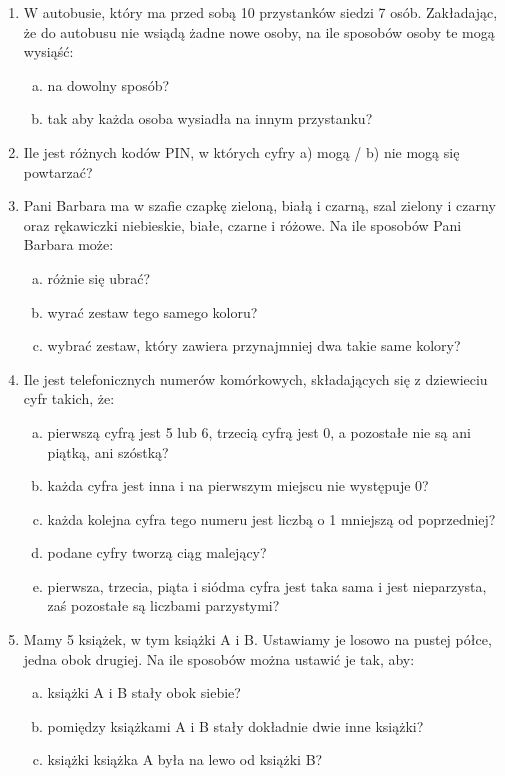 \documentclass[12pt,a4paper]{article}
\begin{document}
\begin{enumerate}[1.]
\begin{enumerate}[a)]
	\end{enumerate}
\newpage
	\item W autobusie, który ma przed sobą 10 przystanków siedzi 7 osób. Zakładając, że do autobusu nie wsiądą żadne nowe osoby, na ile sposobów osoby te mogą wysiąść:
	\begin{enumerate}[a)]
		\item na dowolny sposób?
		\item tak aby każda osoba wysiadła na innym przystanku?
	\end{enumerate}
	\item Ile jest różnych kodów PIN, w których cyfry a) mogą / b) nie mogą się powtarzać?
	\item Pani Barbara ma w szafie czapkę zieloną, białą i czarną, szal zielony i czarny oraz rękawiczki niebieskie, białe, czarne i różowe. Na ile sposobów Pani Barbara może:
	\begin{enumerate}[a)]
		\item różnie się ubrać?
		\item wyrać zestaw tego samego koloru?
		\item wybrać zestaw, który zawiera przynajmniej dwa takie same kolory?
	\end{enumerate}
	\item Ile jest telefonicznych numerów komórkowych, składających się z dziewieciu cyfr takich, że:
	\begin{enumerate}[a)]
		\item pierwszą cyfrą jest 5 lub 6, trzecią cyfrą jest 0, a pozostałe nie są ani piątką, ani szóstką?
		\item każda cyfra jest inna i na pierwszym miejscu nie występuje 0?
		\item każda kolejna cyfra tego numeru jest liczbą o 1 mniejszą od poprzedniej?
		\item podane cyfry tworzą ciąg malejący?
		\item pierwsza, trzecia, piąta i siódma cyfra jest taka sama i jest nieparzysta, zaś pozostałe są liczbami parzystymi?
	\end{enumerate}
	\item Mamy 5 książek, w tym książki A i B. Ustawiamy je losowo na pustej półce, jedna obok drugiej. Na ile sposobów można ustawić je tak, aby:
	\begin{enumerate}[a)]
		\item książki A i B stały obok siebie?
		\item pomiędzy książkami A i B stały dokładnie dwie inne książki?
		\item książki książka A była na lewo od książki B?

\end{enumerate}
\end{enumerate}
\end{document}

